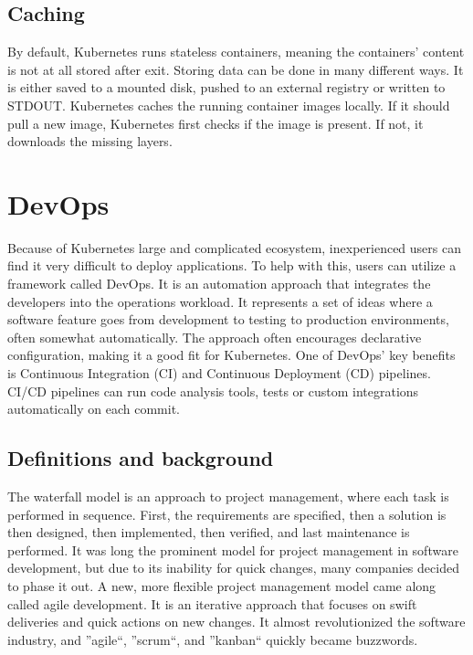 \subsection{Caching}
By default, Kubernetes runs stateless containers\cite{k8s_docs}, meaning the containers' content is not at all stored after exit. Storing data can be done in many different ways. It is either saved to a mounted disk, pushed to an external registry or written to STDOUT. Kubernetes caches the running container images locally. If it should pull a new image, Kubernetes first checks if the image is present. If not, it downloads the missing layers. 

\section{DevOps} %
Because of Kubernetes large and complicated ecosystem, inexperienced users can find it very difficult to deploy applications. To help with this, users can utilize a framework called DevOps. It is an automation approach that integrates the developers into the operations workload\cite{redhat_devops}. It represents a set of ideas where a software feature goes from development to testing to production environments, often somewhat automatically. The approach often encourages declarative configuration, making it a good fit for Kubernetes. One of DevOps' key benefits is Continuous Integration (CI) and Continuous Deployment (CD) pipelines. CI/CD pipelines can run code analysis tools, tests or custom integrations automatically on each commit.
\subsection{Definitions and background}
The waterfall model is an approach to project management, where each task is performed in sequence\cite{waterfall_agile}. First, the requirements are specified, then a solution is then designed, then implemented, then verified, and last maintenance is performed. It was long the prominent model for project management in software development, but due to its inability for quick changes, many companies decided to phase it out. A new, more flexible project management model came along called agile development. It is an iterative approach that focuses on swift deliveries and quick actions on new changes. It almost revolutionized the software industry, and ''agile``, ''scrum``, and ''kanban`` quickly became buzzwords. 

